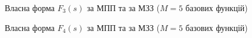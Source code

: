 \begin{figure}[H]\centering
    \resizebox{\linewidth}{!}{}
    \caption{Власна форма $F_3(s)$ за МПП та за МЗЗ ($M=5$ базових функцій)}
    \label{pic: WRM (5) F3(s) eigenvector}
\end{figure}

\begin{figure}[H]\centering
    \resizebox{\linewidth}{!}{}
    \caption{Власна форма $F_4(s)$ за МПП та за МЗЗ ($M=5$ базових функцій)}
    \label{pic: WRM (5) F4(s) eigenvector}
\end{figure}
